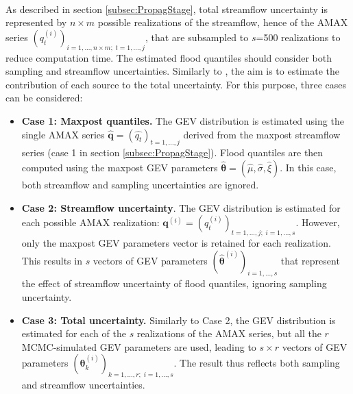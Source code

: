    \paragraph{}
    As described in section \ref{subsec:PropagStage}, total streamflow uncertainty is represented by $n \times m$ possible realizations of the streamflow, hence of the AMAX series $(q_t^{(i)})_{i=1,...,n \times m;\;t=1,...,j}$, that are subsampled to $s$=500 realizations to reduce computation time. The estimated flood quantiles should consider both sampling and streamflow uncertainties. Similarly to \citet{steinbakk_propagation_2016}, the aim is to estimate the contribution of each source to the total uncertainty. For this purpose, three cases can be considered:
    
    \begin{itemize}
        \item \textbf{Case 1: Maxpost quantiles.}        
        The GEV distribution is estimated using the  single AMAX series $\mathbf{\hat{q}} = (\hat{q_t})_{t=1,...,j}$ derived from the maxpost streamflow series (case 1 in section \ref{subsec:PropagStage}). Flood quantiles are then computed using the maxpost GEV parameters $\boldsymbol{\hat{\theta}} =  (\hat{\mu}, \hat{\sigma}, \hat{\xi})$. In this case, both streamflow and sampling uncertainties are ignored.
        
        \item \textbf{Case 2: Streamflow uncertainty}. The GEV distribution is estimated for each possible AMAX realization: $\mathbf{q}^{(i)} = (q_t^{(i)})_{t=1,...,j;\;i=1,...,s}$. However, only the maxpost GEV parameters vector is retained for each realization. This results in $s$ vectors of GEV parameters $(\boldsymbol{\hat{\theta}}^{(i)})_{i=1,...,s}$ that represent the effect of streamflow uncertainty of flood quantiles, ignoring sampling uncertainty.
    
        \item \textbf{Case 3: Total uncertainty.} Similarly to Case 2, the GEV distribution is estimated for each of the $s$ realizations of the AMAX series, but all the $r$ MCMC-simulated GEV parameters are used, leading to $s \times r$ vectors of GEV parameters $(\boldsymbol{\theta}^{(i)}_k)_{k=1,...,r;\;i=1,...,s}$. The result thus reflects both sampling and streamflow uncertainties.
    \end{itemize}
    
